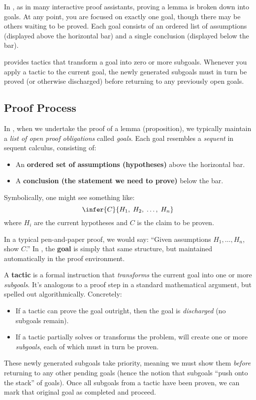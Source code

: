 In \EasyCrypt, as in many interactive proof assistants, proving a lemma is broken down into goals. At any point, you are focused on exactly one goal, though there may be others waiting to be proved. Each goal consists of an ordered list of assumptions (displayed above the horizontal bar) and a single conclusion (displayed below the bar).

\EasyCrypt provides tactics that transform a goal into zero or more subgoals. Whenever you apply a tactic to the current goal, the newly generated subgoals must in turn be proved (or otherwise discharged) before returning to any previously open goals.

\subsection{Proof Process}

In \EasyCrypt, when we undertake the proof of a lemma (proposition), we typically maintain a \textit{list of open proof obligations} called \textit{goals}. Each goal resembles a \textit{sequent} in sequent calculus, consisting of:
\begin{itemize}
	\item An \textbf{ordered set of assumptions (hypotheses)} above the horizontal bar.  
	\item A \textbf{conclusion (the statement we need to prove)} below the bar.
\end{itemize}
Symbolically, one might see something like: \[
\infer{C}{H_1,\;H_2,\;\dots,\;H_n}
\] where \(H_i\) are the current hypotheses and \(C\) is the claim to be proven.

In a typical pen-and-paper proof, we would say: ``Given assumptions \(H_1,\dots,H_n\), show \(C\).'' In \EasyCrypt, the \textbf{goal} is simply that same structure, but maintained automatically in the proof environment.

A \textbf{tactic} is a formal instruction that \textit{transforms} the current goal into one or more \textit{subgoals}. It’s analogous to a proof step in a standard mathematical argument, but spelled out algorithmically. Concretely:
\begin{itemize}
	\item If a tactic can prove the goal outright, then the goal is \textit{discharged} (no subgoals remain).  
	\item If a tactic partially solves or transforms the problem, \EasyCrypt will create one or more \textit{subgoals}, each of which must in turn be proven.  
\end{itemize}
These newly generated subgoals take priority, meaning we must show them \textit{before} returning to any other pending goals (hence the notion that subgoals ``push onto the stack'' of goals). Once all subgoals from a tactic have been proven, we can mark that original goal as completed and proceed.


